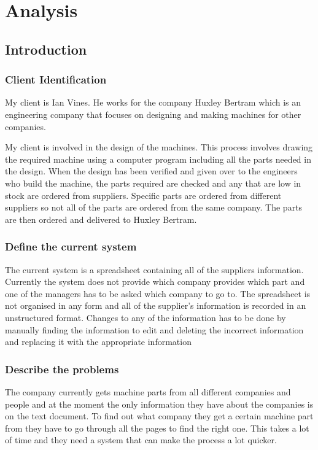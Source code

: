\chapter{Analysis}

\section{Introduction}

\subsection{Client Identification}
My client is Ian Vines. He works for the company Huxley Bertram which is an engineering company that focuses on designing and making machines for other companies. \par

My client is involved in the design of the machines. This process involves drawing the required machine using a computer program including all the parts needed in the design. When the design has been verified and given over to the engineers who build the machine, the parts required are checked and any that are low in stock are ordered from suppliers. Specific parts are ordered from different suppliers so not all of the parts are ordered from the same company. The parts are then ordered and delivered to Huxley Bertram.
\subsection{Define the current system}
The current system is a spreadsheet containing all of the suppliers information. Currently the system does not provide which company provides which part and one of the managers has to be asked which company to go to. The spreadsheet is not organised in any form and all of the supplier's information is recorded in an unstructured format. Changes to any of the information has to be done by manually finding the information to edit and deleting the incorrect information and replacing it with the appropriate information
\subsection{Describe the problems}
The company currently gets machine parts from all different companies and people and at the moment the only information they have about the companies is on the text document. To find out what company they get a certain machine part from they have to go through all the pages to find the right one. This takes a lot of time and they need a system that can make the process a lot quicker.

